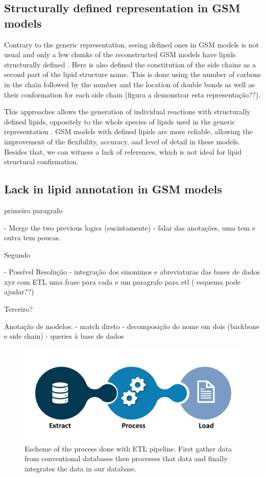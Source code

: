 \documentclass{llncs}
\begin{document}
\subsection{Structurally defined representation in GSM models}
Contrary to the generic representation, seeing defined ones in GSM models is not usual and only a few chunks of the reconstructed GSM models have lipids structurally defined \cite{Schutzhold}.
Here is also defined the constitution of the side chains as a second part of the lipid structure name. This is done using the number of carbons in the chain followed by the number and the location of double bonds as well as their conformation for each side chain (figura a demonstrar esta representação??).

This approaches allows the generation of individual reactions with structurally defined lipids, oppositely to the whole species of lipids used in the generic representation \cite{Aung2013}.
GSM models with defined lipids are more reliable,  allowing the improvement of the flexibility, accuracy, and level of detail in these models.
Besides that, we can witness a lack of references, which is not ideal for lipid structural confirmation.

\subsection{Lack in lipid annotation in GSM models}
primeiro paragrafo

- Merge the two previous logics (sucintamente)
- falar das anotações, uma tem e outra tem poucas.

Segundo

- Possível Resolução
    - integração dos sinonimos e abreviaturas das bases de dados xyz com ETL
    uma frase para cada e um paragrafo para etl ( esquema pode ajudar??)

Terceiro?   

Anotação de modelos:
    - match direto
    - decomposição do nome em dois (backbone e side chain) - queries à base de dados
\begin{figure}
    \includegraphics[width=\textwidth]{imagens/ETL.png}
    \caption{Escheme of the process done with ETL pipeline.
    First gather data from conventional databases
    then processes that data
    and finally integrates the data in our database.} \label{fig2}    
\end{figure}







\end{document}
